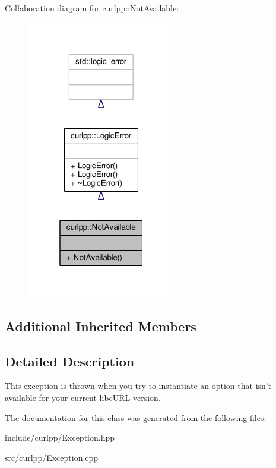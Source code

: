 Collaboration diagram for curlpp\-:\-:Not\-Available\-:\nopagebreak
\begin{figure}[H]
\begin{center}
\leavevmode
\includegraphics[width=184pt]{classcurlpp_1_1NotAvailable__coll__graph}
\end{center}
\end{figure}
\subsection*{Additional Inherited Members}


\subsection{Detailed Description}
This exception is thrown when you try to instantiate an option that isn't available for your current libc\-U\-R\-L version. 

The documentation for this class was generated from the following files\-:\begin{DoxyCompactItemize}
\item 
include/curlpp/Exception.\-hpp\item 
src/curlpp/Exception.\-cpp\end{DoxyCompactItemize}
